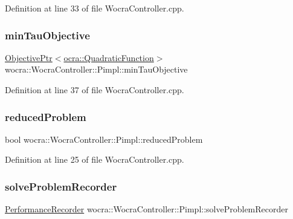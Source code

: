Definition at line 33 of file Wocra\+Controller.\+cpp.

\hypertarget{structwocra_1_1WocraController_1_1Pimpl_a02fbd15274314a18d7518ad0bb721358}{}\label{structwocra_1_1WocraController_1_1Pimpl_a02fbd15274314a18d7518ad0bb721358} 
\subsubsection{\texorpdfstring{min\+Tau\+Objective}{minTauObjective}}
{\footnotesize\ttfamily \hyperlink{classocra_1_1ObjectivePtr}{Objective\+Ptr}$<$\hyperlink{classocra_1_1QuadraticFunction}{ocra\+::\+Quadratic\+Function}$>$ wocra\+::\+Wocra\+Controller\+::\+Pimpl\+::min\+Tau\+Objective}



Definition at line 37 of file Wocra\+Controller.\+cpp.

\hypertarget{structwocra_1_1WocraController_1_1Pimpl_a809b85a6059fda8abddf709a92224443}{}\label{structwocra_1_1WocraController_1_1Pimpl_a809b85a6059fda8abddf709a92224443} 
\subsubsection{\texorpdfstring{reduced\+Problem}{reducedProblem}}
{\footnotesize\ttfamily bool wocra\+::\+Wocra\+Controller\+::\+Pimpl\+::reduced\+Problem}



Definition at line 25 of file Wocra\+Controller.\+cpp.

\hypertarget{structwocra_1_1WocraController_1_1Pimpl_a446e043430909aacb7955ff847c3a311}{}\label{structwocra_1_1WocraController_1_1Pimpl_a446e043430909aacb7955ff847c3a311} 
\subsubsection{\texorpdfstring{solve\+Problem\+Recorder}{solveProblemRecorder}}
{\footnotesize\ttfamily \hyperlink{classwocra_1_1PerformanceRecorder}{Performance\+Recorder} wocra\+::\+Wocra\+Controller\+::\+Pimpl\+::solve\+Problem\+Recorder}



